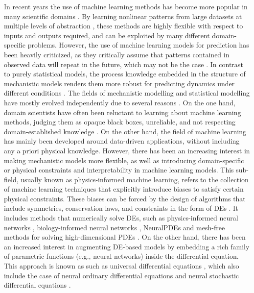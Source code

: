 In recent years the use of machine learning methods has become more popular in many scientific domains \cite{rasp2018, pichler2023, meuwly2021machine, borowiec2022, lai2024machine}. 
By learning nonlinear patterns from large datasets at multiple levels of abstraction \cite{LeCun2015}, these methods are highly flexible with respect to inputs and outputs required, and can be exploited by many different domain-specific problems.
However, the use of machine learning models for prediction has been heavily criticized, as they critically assume that patterns contained in observed data will repeat in the future, which may not be the case \cite{dormann2007,Barnosky2012}. 
In contrast to purely statistical models, the process knowledge embedded in the structure of mechanistic models renders them more robust for predicting dynamics under different conditions \cite{Barnosky2012}.
The fields of mechanistic modelling and statistical modelling have mostly evolved independently due to several reasons \cite{zdeborova_understanding_2020}. 
On the one hand, domain scientists have often been reluctant to learning about machine learning methods, judging them as opaque black boxes, unreliable, and not respecting domain-established knowledge \cite{Coveney:2016eb}. 
On the other hand, the field of machine learning has mainly been developed around data-driven applications, without including any a priori physical knowledge. 
However, there has been an increasing interest in making mechanistic models more flexible, as well as introducing domain-specific or physical constraints and interpretability in machine learning models. 
This sub-field, usually known as physics-informed machine learning, refers to the collection of machine learning techniques that explicitly introduce biases to satisfy certain physical constraints. 
These biases can be forced by the design of algorithms that include symmetries, conservation laws, and constraints in the form of DEs \cite{Karniadakis_Kevrekidis_Lu_Perdikaris_Wang_Yang_2021}. 
It includes methods that numerically solve DEs, such as physics-informed neural networks \cite{PINNs_2019}, biology-informed neural networks \cite{Yazdani2020,Lagergren_Nardini_Baker_Simpson_Flores_2020}, NeuralPDEs \cite{Zubov_McCarthy_Ma_Calisto_Pagliarino_Azeglio_Bottero_Luján_Sulzer_Bharambe_et} and mesh-free methods for solving high-dimensional PDEs \cite{boussange2023a}. 
On the other hand, there has been an increased interest in augmenting DE-based models by embedding a rich family of parametric functions (e.g., neural networks) inside the differential equation.  
This approach is known as such as universal differential equations \cite{rackauckas2020universal, Dandekar_2020}, which also include the case of neural ordinary differential equations \cite{chen_neural_2019} and neural stochastic differential equations \cite{li2020scalable}.


